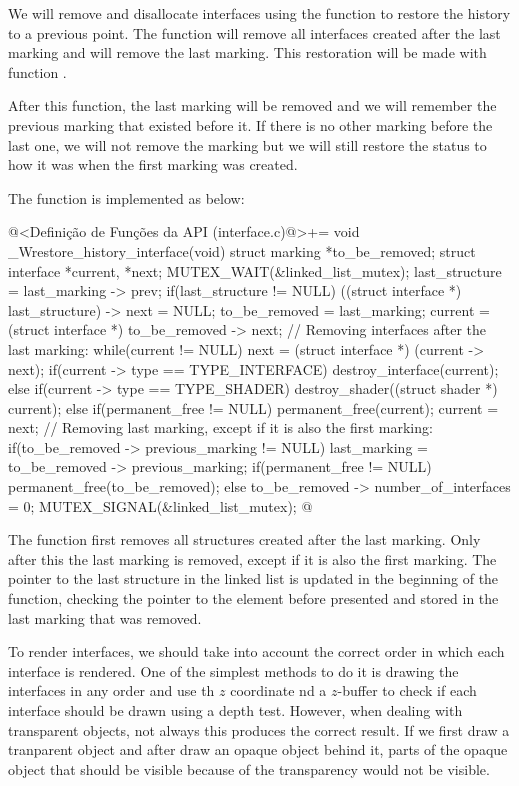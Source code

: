 
We will remove and disallocate interfaces using the function to
restore the history to a previous point. The function will remove all
interfaces created after the last marking and will remove the last
marking. This restoration will be made with
function .

After this function, the last marking will be removed and we will
remember the previous marking that existed before it. If there is no
other marking before the last one, we will not remove the marking but
we will still restore the status to how it was when the first marking
was created.

The function is implemented as below:

\iniciocodigo
@<Definição de Funções da API (interface.c)@>+=
void _Wrestore_history_interface(void){
  struct marking *to_be_removed;
  struct interface *current, *next;
  MUTEX_WAIT(&linked_list_mutex);
  last_structure = last_marking -> prev;
  if(last_structure != NULL)
    ((struct interface *) last_structure) -> next = NULL;
  to_be_removed = last_marking;
  current = (struct interface *) to_be_removed -> next;
  // Removing interfaces after the last marking:
  while(current != NULL){
    next = (struct interface *) (current -> next);
    if(current -> type == TYPE_INTERFACE)
      destroy_interface(current);
    else if(current -> type == TYPE_SHADER)
      destroy_shader((struct shader *) current);
    else if(permanent_free != NULL)
      permanent_free(current);
    current = next;
  }
  // Removing last marking, except if it is also the first marking:
  if(to_be_removed -> previous_marking != NULL){
    last_marking = to_be_removed -> previous_marking;
    if(permanent_free != NULL)
      permanent_free(to_be_removed);
  }
  else
    to_be_removed -> number_of_interfaces = 0;
  MUTEX_SIGNAL(&linked_list_mutex);
}
@
\fimcodigo

The function first removes all structures created after the last
marking. Only after this the last marking is removed, except if it is
also the first marking. The pointer to the last structure in the
linked list is updated in the beginning of the function, checking the
pointer to the element before presented and stored in the last
marking that was removed.


To render interfaces, we should take into account the correct order in
which each interface is rendered. One of the simplest methods to do it
is drawing the interfaces in any order and use th $z$ coordinate nd a
$z$-buffer to check if each interface should be drawn using a depth
test. However, when dealing with transparent objects, not always this
produces the correct result. If we first draw a tranparent object and
after draw an opaque object behind it, parts of the opaque object that
should be visible because of the transparency would not be visible.

